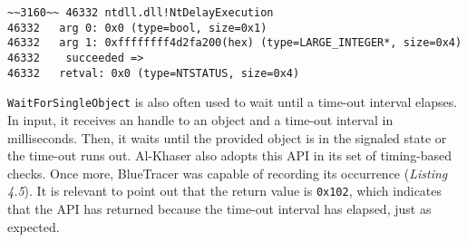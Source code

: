 \vspace{0.5cm}
\begin{lstlisting}[caption={Log entry relative to \texttt{NtDelayExecution}},captionpos=b]
~~3160~~ 46332 ntdll.dll!NtDelayExecution
46332 	arg 0: 0x0 (type=bool, size=0x1)
46332 	arg 1: 0xffffffff4d2fa200(hex) (type=LARGE_INTEGER*, size=0x4)
46332    succeeded =>
46332 	retval: 0x0 (type=NTSTATUS, size=0x4)
\end{lstlisting}

\texttt{WaitForSingleObject} is also often used to wait until a time-out interval elapses. In input, it receives an handle to an object and a time-out interval in milliseconds. Then, it waits until the provided object is in the signaled state or the time-out runs out. Al-Khaser also adopts this API in its set of timing-based checks. Once more, BlueTracer was capable of recording its occurrence (\textit{Listing 4.5}). It is relevant to point out that the return value is \texttt{0x102}, which indicates that the API has returned because the time-out interval has elapsed, just as expected.

